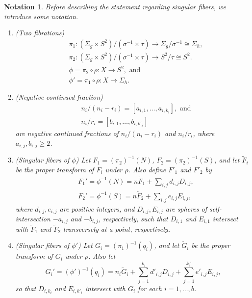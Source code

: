 \documentclass[10pt,a4paper,reqno]{amsart}
\newtheorem{notation}[thm]{Notation}
\theoremstyle{definition}
\numberwithin{equation}{section}
\numberwithin{figure}{section}
\newcommand{\arrowr}{\rightarrow}
\begin{document}
\begin{notation}
Before describing the statement regarding singular fibers, we introduce some notation.
\begin{enumerate}
\item (Two fibrations) 
\begin{align*}
&\pi_1:(\Sigma_g \times S^2 )/(\sigma^{-1} \times \tau) \arrowr \Sigma_g/\sigma^{-1} \cong \Sigma_h, \\ 
&\pi_2: (\Sigma_g \times S^2)/(\sigma^{-1} \times \tau)\arrowr S^2/\tau\cong S^2. \\ 
&\phi=\pi_2 \circ \rho: X \arrowr S^2, \text{ and} \\ 
&\phi'= \pi_1 \circ \rho: X \arrowr \Sigma_h.
\end{align*}

\item (Negative continued fraction) 
\begin{align*}
&n_i/(n_i-r_i)=\left[a_{i,1},\dots, a_{i,k_i}\right], \text{ and} \\ 
&n_i/r_i=\left[b_{i,1},\dots, b_{i,k'_i}\right]
\end{align*}
are negative continued fractions of $n_i/(n_i-r_i)$ and $n_i/r_i$, where $a_{i,j}, b_{i,j}\ge 2$. 

\item (Singular fibers of $\phi$)
Let $F_1=(\pi_2)^{-1}(N)$, $F_2=(\pi_2)^{-1}(S)$, and let $\tilde{F}_i$ be the proper transform of $F_i$ under $\rho$. 
Also define $F'_1$ and $F'_2$ by
\begin{align}
&F_1'=\phi^{-1}(N)=n\tilde{F}_1+\sum_{i,j} d_{i,j} D_{i,j}, \\
&F_2'=\phi^{-1}(S)=n\tilde{F}_2+\sum_{i,j} e_{i,j} E_{i,j},
\end{align}
where $d_{i,j}, e_{i,j}$ are positive integers, and $D_{i,j}, E_{i,j}$ are spheres of self-intersection $-a_{i,j}$ and $-b_{i,j}$, respectively, 
such that $D_{i,1}$ and $E_{i,1}$ intersect with $\tilde{F}_1$ and $\tilde{F}_2$ transversely at a point, respectively.

\item (Singular fibers of $\phi'$)
Let $G_i=(\pi_1)^{-1}(q_i)$, and let $\tilde{G}_i$ be the proper transform of $G_i$ under $\rho$. 
Also let
\begin{equation} \label{eq:S^2_fibers}
G_i'=(\phi')^{-1}(q_i)={n_i}\tilde{G}_i+\sum_{j=1}^{k_i} d'_{i,j} D_{i,j}+\sum_{j=1}^{k_i'} e'_{i,j} E_{i,j},
\end{equation}
so that $D_{i,k_i}$ and $E_{i,k'_i}$ intersect with $G_i$ for each $i=1,\dots,b$.
\end{enumerate}
\end{notation}
\end{document}
